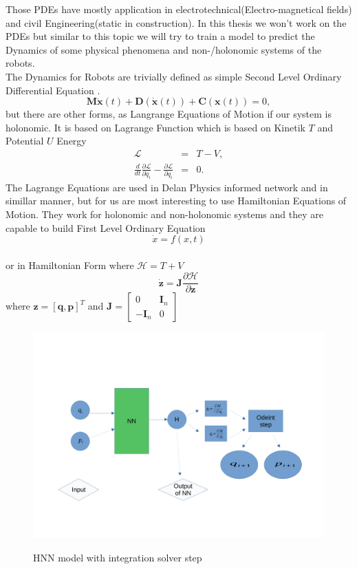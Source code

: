 Those PDEs have mostly application in electrotechnical(Electro-magnetical fields) and  civil Engineering(static in construction).
In this thesis we won't work on the PDEs but similar to this topic we will try to train a model to predict the Dynamics of some physical phenomena and non-/holonomic systems of the robots.\\
The Dynamics for Robots are trivially defined as simple Second Level Ordinary Differential Equation\cite{} .
\begin{equation}
	\mathbf{M}\ddot{\mathbf{x}}(t) + \mathbf{D}(\dot{\mathbf{x}}(t)) + \mathbf{C}(\mathbf{x}(t))=0,
\end{equation} but there are other forms, as Langrange Equations of Motion if our system is holonomic\cite{}. It is based on Lagrange Function which is based on Kinetik $T$ and Potential $U$ Energy
\begin{eqnarray}
	\mathcal{L} &=& T - V,\\
	\frac{d}{dt}\frac{\partial \mathcal{L}}{\partial \dot{q}_i} - \frac{\partial \mathcal{L}}{\partial q_i}&=&0.
\end{eqnarray}   
The Lagrange Equations are used in Delan\cite{} Physics informed network and in simillar manner, but for us are most interesting to use Hamiltonian Equations of Motion.
They work for holonomic and non-holonomic systems and they are capable to build First Level Ordinary Equation
\begin{equation}
	\dot{x} = f(x,t)
\end{equation} \\
or in Hamiltonian Form where $\mathcal{H} = T + V$
\begin{equation}
	\dot{\mathbf{z}} = \mathbf{J}\frac{\partial\mathcal{H}}{\partial \mathbf{z}}
\end{equation} where $\mathbf{z}=[\mathbf{q},\mathbf{p}]^T$ and $\mathbf{J} = \begin{bmatrix}
0 & \mathbf{I}_n\\
-\mathbf{I}_n & 0
\end{bmatrix} $\\
\begin{figure}[h!]
	\includegraphics[width=15cm]{chapters/chapter1/hnn}
	\label{hnn}
	\caption{HNN model with integration solver step}
\end{figure}
